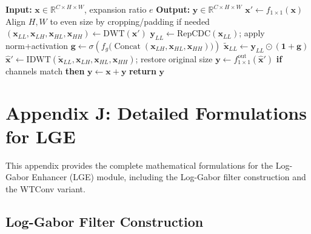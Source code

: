 \documentclass{article}
\theoremstyle{plain}
\theoremstyle{definition}
\theoremstyle{remark}
\begin{document}
 \begin{algorithm}[H]
 \caption{WDG forward pass (Wavelet-Difference Gate).}
 \label{alg:wdg}
 \scriptsize
\begin{algorithmic}
   \STATE \textbf{Input:} $\mathbf{x}\in\mathbb{R}^{C\times H\times W}$, expansion ratio $e$
   \STATE \textbf{Output:} $\mathbf{y}\in\mathbb{R}^{C\times H\times W}$
   \STATE $\mathbf{x}' \leftarrow f_{1\times1}(\mathbf{x})$ 
   \STATE Align $H,W$ to even size by cropping/padding if needed
   \STATE $(\mathbf{x}_{LL},\mathbf{x}_{LH},\mathbf{x}_{HL},\mathbf{x}_{HH}) \leftarrow \mathrm{DWT}(\mathbf{x}')$
   \STATE $\mathbf{y}_{LL} \leftarrow \mathrm{RepCDC}(\mathbf{x}_{LL})$; apply norm+activation
   \STATE $\mathbf{g} \leftarrow \sigma\!\left(f_g\bigl(\operatorname{Concat}(\mathbf{x}_{LH},\mathbf{x}_{HL},\mathbf{x}_{HH})\bigr)\right)$
   \STATE $\widetilde{\mathbf{x}}_{LL} \leftarrow \mathbf{y}_{LL} \odot (\mathbf{1}+\mathbf{g})$
   \STATE $\widehat{\mathbf{x}}' \leftarrow \mathrm{IDWT}(\widetilde{\mathbf{x}}_{LL},\mathbf{x}_{LH},\mathbf{x}_{HL},\mathbf{x}_{HH})$; restore original size
   \STATE $\mathbf{y} \leftarrow f^{\mathrm{out}}_{1\times1}(\widehat{\mathbf{x}}')$
   \STATE \textbf{if} channels match \textbf{then} $\mathbf{y} \leftarrow \mathbf{x}+\mathbf{y}$
   \STATE \textbf{return} $\mathbf{y}$
 \end{algorithmic}
 \end{algorithm}

\section{Appendix J: Detailed Formulations for LGE}
\label{sec:appendix_lge_details}

This appendix provides the complete mathematical formulations for the Log-Gabor Enhancer (LGE) module, including the Log-Gabor filter construction and the WTConv variant.

\subsection{Log-Gabor Filter Construction}
\end{document}

